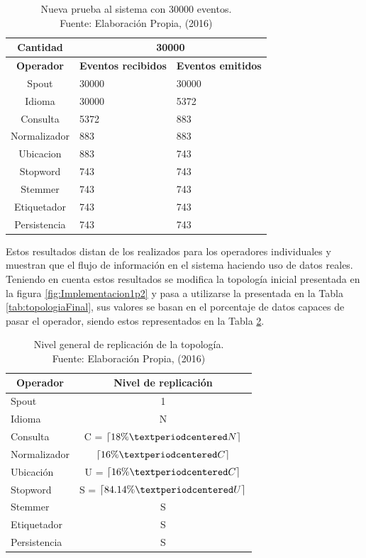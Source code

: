 \begin{table}[H]
\centering
\caption[Nueva prueba al sistema con 30000 eventos.]{Nueva prueba al sistema con 30000 eventos.\\Fuente: Elaboración Propia, (2016)}
\label{tab:sistemaCompletoEstadosCorregidos}
\begin{tabular}{|c|l|l|}
\hline
\textbf{Cantidad} & \multicolumn{2}{c|}{\textbf{30000}} \\ \hline
\textbf{Operador} & \multicolumn{1}{c|}{\textbf{Eventos recibidos}} & \multicolumn{1}{c|}{\textbf{Eventos emitidos}} \\ \hline
Spout & 30000 & 30000 \\ \hline
Idioma & 30000 & 5372 \\ \hline
Consulta & 5372 & 883 \\ \hline
Normalizador & 883 & 883 \\ \hline
Ubicacion & 883 & 743 \\ \hline
Stopword & 743 & 743 \\ \hline
Stemmer & 743 & 743 \\ \hline
Etiquetador & 743 & 743 \\ \hline
Persistencia & 743 & 743 \\ \hline
\end{tabular}
\end{table}

Estos resultados distan de los realizados para los operadores individuales y muestran que el flujo de información en el sistema haciendo uso de datos reales. Teniendo en cuenta estos resultados se modifica la topología inicial presentada en la figura \ref{fig:Implementacion1p2} y pasa a utilizarse la presentada en la Tabla \ref{tab:topologiaFinal}, sus valores se basan en el porcentaje de datos capaces de pasar el operador, siendo estos representados en la Tabla \ref{tab:topologiaFinal2}.

\begin{table}[H]
\caption[Nivel general de replicación de la topología.]{Nivel general de replicación de la topología.\\Fuente: Elaboración Propia, (2016)}
\centering
\label{tab:topologiaFinal2}
\begin{tabular}{|l|c|}
\hline
\multicolumn{1}{|c|}{\textbf{Operador}} & \textbf{Nivel de replicación} \\ \hline
Spout & 1 \\ \hline
Idioma & N \\ \hline
Consulta & C = $\ceil{18\% · N}$ \\ \hline
Normalizador & $\ceil{16\% · C}$ \\ \hline
Ubicación & U = $\ceil{16\% · C}$ \\ \hline
Stopword & S = $\ceil{84.14\% · U}$ \\ \hline
Stemmer & S \\ \hline
Etiquetador & S \\ \hline
Persistencia & S \\ \hline
\end{tabular}
\end{table}
        
